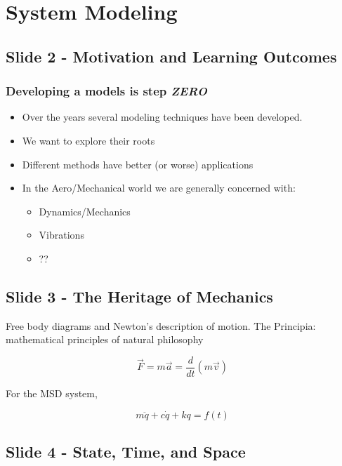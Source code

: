 \documentclass[
  letterpaper,
  DIV=11,
  numbers=noendperiod]{scrreprt}
\providecommand{\tightlist}{%
  \setlength{\itemsep}{0pt}\setlength{\parskip}{0pt}}
\begin{document}

\chapter{System Modeling}\label{system-modeling}

\section{Slide 2 - Motivation and Learning
Outcomes}\label{slide-2---motivation-and-learning-outcomes-2}

\subsection{\texorpdfstring{Developing a models is step
\emph{ZERO}}{Developing a models is step ZERO}}\label{developing-a-models-is-step-zero}

\begin{itemize}
\tightlist
\item
  Over the years several modeling techniques have been developed.
\item
  We want to explore their roots
\item
  Different methods have better (or worse) applications
\item
  In the Aero/Mechanical world we are generally concerned with:

  \begin{itemize}
  \tightlist
  \item
    Dynamics/Mechanics
  \item
    Vibrations
  \item
    ??
  \end{itemize}
\end{itemize}

\section{Slide 3 - The Heritage of
Mechanics}\label{slide-3---the-heritage-of-mechanics}

Free body diagrams and Newton's description of motion. The Principia:
mathematical principles of natural philosophy

\[\vec{F} = m \vec{a} = \frac{d}{dt} (m \vec{v})\]

For the MSD system,

\[m \ddot{q} + c \dot{q} + k q = f(t)\]

\section{Slide 4 - State, Time, and
Space}\label{slide-4---state-time-and-space}
\end{document}
